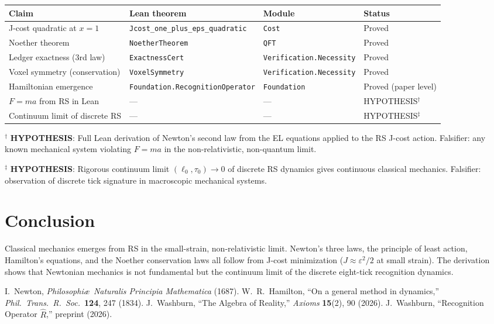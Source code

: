 \documentclass[12pt,a4paper]{article}
\theoremstyle{definition}
\theoremstyle{remark}
\begin{document}
\begin{center}
\begin{tabular}{llll}
\toprule
Claim & Lean theorem & Module & Status \\
\midrule
J-cost quadratic at $x=1$ & \texttt{Jcost\_one\_plus\_eps\_quadratic} & \texttt{Cost} & Proved \\
Noether theorem & \texttt{NoetherTheorem} & \texttt{QFT} & Proved \\
Ledger exactness (3rd law) & \texttt{ExactnessCert} & \texttt{Verification.Necessity} & Proved \\
Voxel symmetry (conservation) & \texttt{VoxelSymmetry} & \texttt{Verification.Necessity} & Proved \\
Hamiltonian emergence & \texttt{Foundation.RecognitionOperator} & \texttt{Foundation} & Proved (paper level) \\
\midrule
$F=ma$ from RS in Lean & --- & --- & HYPOTHESIS$^\dagger$ \\
Continuum limit of discrete RS & --- & --- & HYPOTHESIS$^\ddagger$ \\
\bottomrule
\end{tabular}
\end{center}

$^\dagger$ \textbf{HYPOTHESIS}: Full Lean derivation of Newton's second law from the EL equations applied to the RS J-cost action. Falsifier: any known mechanical system violating $F=ma$ in the non-relativistic, non-quantum limit.

$^\ddagger$ \textbf{HYPOTHESIS}: Rigorous continuum limit $(\ell_0, \tau_0) \to 0$ of discrete RS dynamics gives continuous classical mechanics. Falsifier: observation of discrete tick signature in macroscopic mechanical systems.

\section{Conclusion}

Classical mechanics emerges from RS in the small-strain, non-relativistic
limit.  Newton's three laws, the principle of least action, Hamilton's
equations, and the Noether conservation laws all follow from J-cost
minimization ($J \approx \varepsilon^2/2$ at small strain).  The derivation
shows that Newtonian mechanics is not fundamental but the continuum limit
of the discrete eight-tick recognition dynamics.

\begin{thebibliography}{99}
 I.~Newton, \textit{Philosophi\ae\ Naturalis Principia Mathematica} (1687).
 W.~R.~Hamilton, ``On a general method in dynamics,'' \textit{Phil.\ Trans.\ R.\ Soc.}\ \textbf{124}, 247 (1834).
 J.~Washburn, ``The Algebra of Reality,'' \textit{Axioms} \textbf{15}(2), 90 (2026).
 J.~Washburn, ``Recognition Operator $\hat{R}$,'' preprint (2026).
\end{thebibliography}
\end{document}
